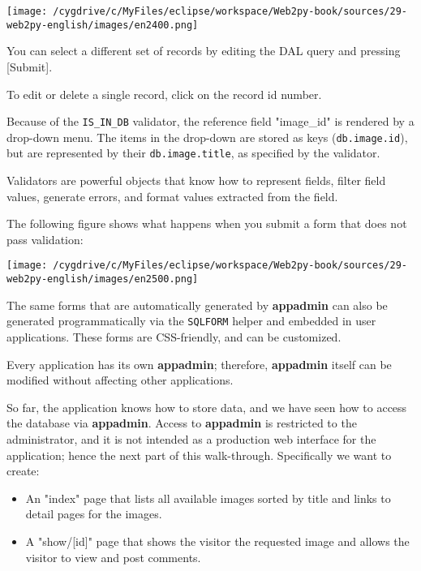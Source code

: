\documentclass[justified,sixbynine,notoc]{tufte-book}
\def\ft{\small\tt}
\begin{document}
\begin{fullwidth}
\goodbreak\begin{center}\texttt{[image: /cygdrive/c/MyFiles/eclipse/workspace/Web2py-book/sources/29-web2py-english/images/en2400.png]}\end{center}


You can select a different set of records by editing the DAL query and pressing [Submit].

To edit or delete a single record, click on the record id number.

Because of the {\ft IS\_IN\_DB} validator, the reference field "image\_id" is rendered by a drop-down menu. The items in the drop-down are stored as keys ({\ft db.image.id}), but are represented by their {\ft db.image.title}, as specified by the validator.

Validators are powerful objects that know how to represent fields, filter field values, generate errors, and format values extracted from the field.

The following figure shows what happens when you submit a form that does not pass validation:


\goodbreak\begin{center}\texttt{[image: /cygdrive/c/MyFiles/eclipse/workspace/Web2py-book/sources/29-web2py-english/images/en2500.png]}\end{center}


The same forms that are automatically generated by {\bf appadmin} can also be generated programmatically via the {\ft SQLFORM} helper and embedded in user applications. These forms are CSS-friendly, and can be customized.

Every application has its own {\bf appadmin}; therefore, {\bf appadmin} itself can be modified without affecting other applications.

So far, the application knows how to store data, and we have seen how to access the database via {\bf appadmin}. Access to {\bf appadmin} is restricted to the administrator, and it is not intended as a production web interface for the application; hence the next part of this walk-through. Specifically we want to create:
\begin{itemize}
\item An "index" page that lists all available images sorted by title and links to detail pages for the images.

\item A "show/[id]" page that shows the visitor the requested image and allows the visitor to view and post comments.


\end{itemize}
\end{fullwidth}
\end{document}
